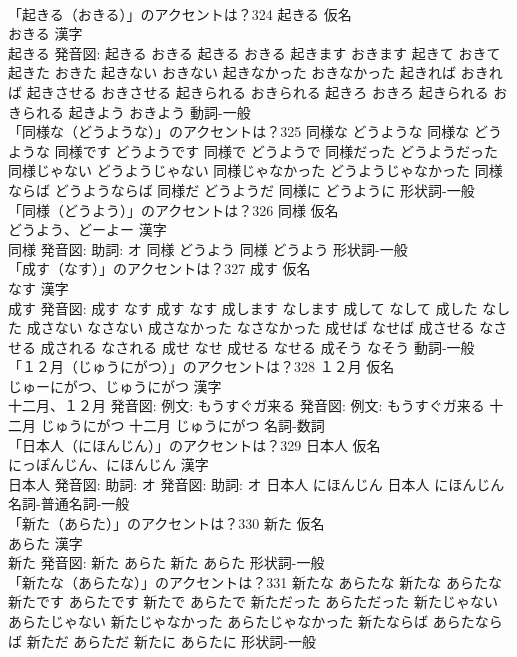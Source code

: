 \documentclass[8pt]{extreport}
\begin{document}
\begin{CJK}{UTF8}{min}
\\	「起きる（おきる）」のアクセントは？324	起きる 仮名　
\\	おきる 漢字　
\\	起きる 発音図:	起きる おきる		起きる おきる 起きます おきます 起きて おきて 起きた おきた 起きない おきない 起きなかった おきなかった 起きれば おきれば 起きさせる おきさせる 起きられる おきられる 起きろ おきろ 起きられる おきられる 起きよう おきよう				動詞-一般 
\\	「同様な（どうような）」のアクセントは？325		同様な どうような		同様な どうような 同様です どうようです 同様で どうようで 同様だった どうようだった 同様じゃない どうようじゃない 同様じゃなかった どうようじゃなかった 同様ならば どうようならば 同様だ どうようだ 同様に どうように				形状詞-一般 
\\	「同様（どうよう）」のアクセントは？326	同様 仮名　
\\	どうよう、どーよー 漢字　
\\	同様 発音図: 助詞: オ	同様 どうよう		同様 どうよう				形状詞-一般 
\\	「成す（なす）」のアクセントは？327	成す 仮名　
\\	なす 漢字　
\\	成す 発音図:	成す なす		成す なす 成します なします 成して なして 成した なした 成さない なさない 成さなかった なさなかった 成せば なせば 成させる なさせる 成される なされる 成せ なせ 成せる なせる 成そう なそう				動詞-一般 
\\	「１２月（じゅうにがつ）」のアクセントは？328	１２月 仮名　
\\	じゅーにがつ、じゅうにがつ 漢字　
\\	十二月、１２月 発音図: 例文: もうすぐガ来る 発音図: 例文: もうすぐガ来る	十二月 じゅうにがつ		十二月 じゅうにがつ				名詞-数詞 
\\	「日本人（にほんじん）」のアクセントは？329	日本人 仮名　
\\	にっぽんじん、にほんじん 漢字　
\\	日本人 発音図: 助詞: オ 発音図: 助詞: オ	日本人 にほんじん		日本人 にほんじん				名詞-普通名詞-一般 
\\	「新た（あらた）」のアクセントは？330	新た 仮名　
\\	あらた 漢字　
\\	新た 発音図:	新た あらた		新た あらた				形状詞-一般 
\\	「新たな（あらたな）」のアクセントは？331		新たな あらたな		新たな あらたな 新たです あらたです 新たで あらたで 新ただった あらただった 新たじゃない あらたじゃない 新たじゃなかった あらたじゃなかった 新たならば あらたならば 新ただ あらただ 新たに あらたに				形状詞-一般 

\end{CJK}
\end{document}
